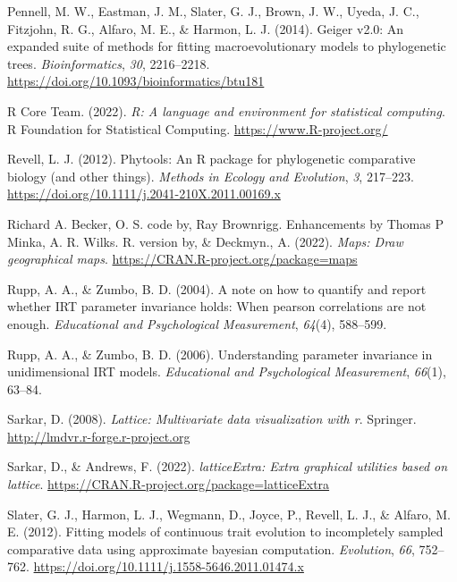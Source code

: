 \documentclass[
  man]{apa6}
\newlength{\cslhangindent}
\newlength{\cslentryspacingunit} %
\newenvironment{CSLReferences}[2] %
 {%
  \setlength{\parindent}{0pt}
  \ifodd #1
  \let\oldpar\par
  \def\par{\hangindent=\cslhangindent\oldpar}
  \fi
  \setlength{\parskip}{#2\cslentryspacingunit}
 }%
 {}
\begin{document}
\begin{CSLReferences}{1}{0}
\leavevmode{}%
Pennell, M. W., Eastman, J. M., Slater, G. J., Brown, J. W., Uyeda, J. C., Fitzjohn, R. G., Alfaro, M. E., \& Harmon, L. J. (2014). Geiger v2.0: An expanded suite of methods for fitting macroevolutionary models to phylogenetic trees. \emph{Bioinformatics}, \emph{30}, 2216--2218. \url{https://doi.org/10.1093/bioinformatics/btu181}

\leavevmode{}%
R Core Team. (2022). \emph{R: A language and environment for statistical computing}. R Foundation for Statistical Computing. \url{https://www.R-project.org/}

\leavevmode{}%
Revell, L. J. (2012). Phytools: An {R} package for phylogenetic comparative biology (and other things). \emph{Methods in Ecology and Evolution}, \emph{3}, 217--223. \url{https://doi.org/10.1111/j.2041-210X.2011.00169.x}

\leavevmode{}%
Richard A. Becker, O. S. code by, Ray Brownrigg. Enhancements by Thomas P Minka, A. R. Wilks. R. version by, \& Deckmyn., A. (2022). \emph{Maps: Draw geographical maps}. \url{https://CRAN.R-project.org/package=maps}

\leavevmode{}%
Rupp, A. A., \& Zumbo, B. D. (2004). A note on how to quantify and report whether IRT parameter invariance holds: When pearson correlations are not enough. \emph{Educational and Psychological Measurement}, \emph{64}(4), 588--599.

\leavevmode{}%
Rupp, A. A., \& Zumbo, B. D. (2006). Understanding parameter invariance in unidimensional IRT models. \emph{Educational and Psychological Measurement}, \emph{66}(1), 63--84.

\leavevmode{}%
Sarkar, D. (2008). \emph{Lattice: Multivariate data visualization with r}. Springer. \url{http://lmdvr.r-forge.r-project.org}

\leavevmode{}%
Sarkar, D., \& Andrews, F. (2022). \emph{latticeExtra: Extra graphical utilities based on lattice}. \url{https://CRAN.R-project.org/package=latticeExtra}

\leavevmode{}%
Slater, G. J., Harmon, L. J., Wegmann, D., Joyce, P., Revell, L. J., \& Alfaro, M. E. (2012). Fitting models of continuous trait evolution to incompletely sampled comparative data using approximate bayesian computation. \emph{Evolution}, \emph{66}, 752--762. \url{https://doi.org/10.1111/j.1558-5646.2011.01474.x}


\end{CSLReferences}
\end{document}
